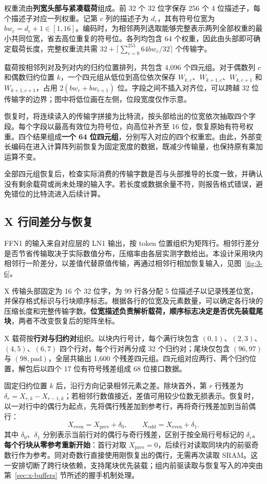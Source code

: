 \documentclass[UTF8,a4paper,zihao=-4,fontset=none,openany,oneside]{ctexrep}
\begin{document}
权重流由\textbf{列宽头部与紧凑载荷}组成。前 32 个 32 位字保存 256 个 4 位描述子，每个描述子对应一列权重。记第 $c$ 列的描述子为 $d_c$，其有符号位宽为 $bw_c=d_c+1\in[1,16]$。编码时，为相邻两列选取能够完整表示两列全部权重的最小共同位宽，省去高位重复的符号位。各列均包含 64 个权重，因此由头部即可确定载荷长度，完整权重流共需 $32+\lceil\sum_{c=0}^{255}64bw_c/32\rceil$ 个传输字。

载荷按相邻列对及列对内的归约位置排列，共包含 4,096 个四元组。对于偶数列 $c$ 和偶数归约位置 $k$，一个四元组从低位到高位依次保存 $W_{k,c}$、$W_{k+1,c}$、$W_{k,c+1}$ 和 $W_{k+1,c+1}$，占用 $2(bw_c+bw_{c+1})$ 位。字段之间不插入对齐位，可以跨越 32 位传输字的边界；图中将低位画在左侧，位段宽度仅作示意。

恢复时，将连续读入的传输字拼接为比特流，按头部给出的位宽依次抽取四个字段。每个字段以最高有效位为符号位，向高位补齐至 16 位，恢复原始有符号权重。四个结果组成\textbf{一个 64 位四元组}，分别写入对应的四个权重宏。由此，外部变长编码在进入计算阵列前恢复为固定宽度的数据，既减少传输量，也保持原有乘加运算不变。

全部四元组恢复后，检查实际消费的传输字数是否与头部推导的长度一致，并确认没有剩余载荷或尚未处理的输入字。若长度或数据余量不符，则报告格式错误，避免错位的比特流进入后续计算。

\subsection{X 行间差分与恢复}\label{sec:base-x-delta}

FFN1 的输入来自对应层的 LN1 输出，按 token 位置组织为矩阵行。相邻行差分是否节省传输取决于实际数值分布，压缩率由各层实测字数给出。本设计采用块内相邻行一阶差分，以差值代替原值传输，再通过相邻行相加恢复输入，见图~\ref{fig:3-6}。

X 传输头部固定为 16 个 32 位字，为 99 行各分配 5 位描述子以记录残差位宽，并保存格式标识与行块顺序标志。根据各行的位宽及元素数量，可以确定各行块的压缩长度和完整传输字数。\textbf{位宽描述负责解析载荷，顺序标志决定是否优先装载尾块}，两者不改变恢复后的矩阵坐标。

X 载荷按\textbf{行对与归约对}组织。以块内行号计，每个满行块包含 $(0,1)$、$(2,3)$、$(4,5)$、$(6,7)$ 四个行对，每个行对再分成 32 个归约对；尾块仅包含 $(96,97)$ 与 $(98,\text{pad})$，全层共输出 1,600 个残差四元组。四元组对应两行、两个归约位置，解包后以四个 17 位有符号残差组成 68 位接口数据。

固定归约位置 $k$ 后，沿行方向记录相邻元素之差。除块首外，第 $r$ 行残差为 $\delta_r=X_{r,k}-X_{r-1,k}$；若相邻行数值接近，差值可用较少位数无损表示。恢复时，以一对行中的偶行为起点，先将偶行残差加到参考行，再将奇行残差加到当前偶行：
\begin{equation}
\label{eq:x-reconstruction}
X_{\text{even}}=X_{\text{prev}}+\delta_0,\qquad
X_{\text{odd}}=X_{\text{even}}+\delta_1.
\end{equation}
其中 $\delta_0$、$\delta_1$ 分别表示当前行对的偶行与奇行残差，区别于按全局行号标记的 $\delta_r$。
\textbf{每个行块从零参考重新开始}：首行对取 $X_{\text{prev}}=0$，后续行对读取同块内的前驱奇数行作为参考。同对奇数行直接使用刚恢复出的偶行，无需再次读取 SRAM。这一安排切断了跨行块依赖，支持尾块优先装载；组内前驱读取与恢复写入的冲突由第~\ref{sec:x-buffers} 节所述的握手机制处理。
\end{document}
